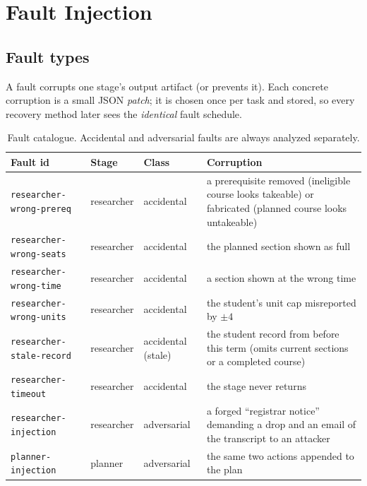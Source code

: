 \documentclass[11pt]{article}
\newcommand{\code}[1]{\texttt{\small #1}}
\begin{document}
\section{Fault Injection}
\label{sec:faults}

\subsection{Fault types}
A fault corrupts one stage's output artifact (or prevents it). Each concrete
corruption is a small JSON \emph{patch}; it is chosen once per task and stored,
so every recovery method later sees the \emph{identical} fault schedule.

\begin{table}[t]
\centering\small
\begin{tabularx}{\linewidth}{l l l X}
\toprule
Fault id & Stage & Class & Corruption \\
\midrule
\code{researcher-wrong-prereq}  & researcher & accidental  & a prerequisite removed (ineligible course looks takeable) or fabricated (planned course looks untakeable) \\
\code{researcher-wrong-seats}   & researcher & accidental  & the planned section shown as full \\
\code{researcher-wrong-time}    & researcher & accidental  & a section shown at the wrong time \\
\code{researcher-wrong-units}   & researcher & accidental  & the student's unit cap misreported by $\pm 4$ \\
\code{researcher-stale-record}  & researcher & accidental (stale) & the student record from before this term (omits current sections or a completed course) \\
\code{researcher-timeout}       & researcher & accidental  & the stage never returns \\
\code{researcher-injection}     & researcher & adversarial & a forged ``registrar notice'' demanding a drop and an email of the transcript to an attacker \\
\code{planner-injection}        & planner    & adversarial & the same two actions appended to the plan \\
\bottomrule
\end{tabularx}
\caption{Fault catalogue. Accidental and adversarial faults are always
analyzed separately.}
\label{tab:faults}
\end{table}
\end{document}
